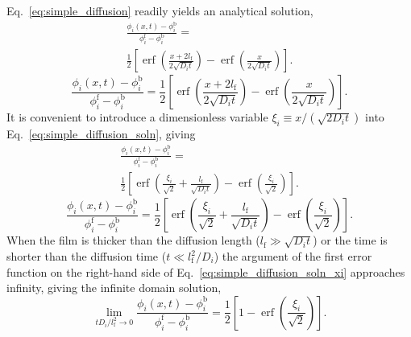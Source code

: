\documentclass[journal=mamobx, layout=twocolumn]{achemso}
\DeclareMathOperator{\erf}{erf}
\newcommand{\txtf}{\mathrm{f}}
\newcommand{\txtb}{\mathrm{b}}
\begin{document}
Eq.~\ref{eq:simple_diffusion} readily yields an analytical solution,
\ifdoublecol
\begin{multline} \label{eq:simple_diffusion_soln}
\frac{ \phi_{i}(x, t) - \phi_{i}^{\txtb} }{ \phi_{i}^{\txtf} - \phi_{i}^{\txtb} } = \\
  \frac{1}{2} \left [ \erf \left( \frac{x + 2 l_{\txtf}}{2 \sqrt{D_{i} t}} \right ) - \erf \left( \frac{x}{2\sqrt{D_{i} t}} \right ) \right ] \textrm{.}
\end{multline}
\else
\begin{equation} \label{eq:simple_diffusion_soln}
\frac{ \phi_{i}(x, t) - \phi_{i}^{\txtb} }{ \phi_{i}^{\txtf} - \phi_{i}^{\txtb} } =
  \frac{1}{2} \left [ \erf \left( \frac{x + 2 l_{\txtf}}{2 \sqrt{D_{i} t}} \right ) - \erf \left( \frac{x}{2\sqrt{D_{i} t}} \right ) \right ] \textrm{.}
\end{equation}
\fi
It is convenient to introduce a dimensionless variable $\xi_{i} \equiv x/(\sqrt{2 D_{i}t})$ into Eq.~\ref{eq:simple_diffusion_soln}, giving
\ifdoublecol
\begin{multline} \label{eq:simple_diffusion_soln_xi}
\frac{ \phi_{i}(x, t) - \phi_{i}^{\txtb} }{ \phi_{i}^{\txtf} - \phi_{i}^{\txtb} } = \\
  \frac{1}{2} \left [ \erf \left( \frac{\xi_{i}}{\sqrt{2}} + \frac{l_{\txtf}}{\sqrt{D_{i} t}} \right ) - \erf \left( \frac{\xi_{i}}{\sqrt{2}} \right ) \right ] \textrm{.}
\end{multline}
\else
\begin{equation} \label{eq:simple_diffusion_soln_xi}
\frac{ \phi_{i}(x, t) - \phi_{i}^{\txtb} }{ \phi_{i}^{\txtf} - \phi_{i}^{\txtb} } =
  \frac{1}{2} \left [ \erf \left( \frac{\xi_{i}}{\sqrt{2}} + \frac{l_{\txtf}}{\sqrt{D_{i} t}} \right ) - \erf \left( \frac{\xi_{i}}{\sqrt{2}} \right ) \right ] \textrm{.}
\end{equation}
\fi
When the film is thicker than the diffusion length ($l_{\txtf} \gg \sqrt{D_{i}t}$) or the time is shorter than the diffusion time ($t \ll l_{\txtf}^{2}/D_{i}$) the argument of the first error function on the right-hand side of Eq.~\ref{eq:simple_diffusion_soln_xi} approaches infinity, giving the infinite domain solution,
\begin{equation} \label{eq:simple_diffusion_soln_small_t}
\lim_{ t D_{i}/l_{\txtf}^{2} \rightarrow 0} \frac{ \phi_{i}(x, t) - \phi_{i}^{\txtb} }{ \phi_{i}^{\txtf} - \phi_{i}^{\txtb} } =
  \frac{1}{2} \left [ 1 - \erf \left( \frac{\xi_{i}}{\sqrt{2}} \right ) \right ] \textrm{.}
\end{equation}
\end{document}
